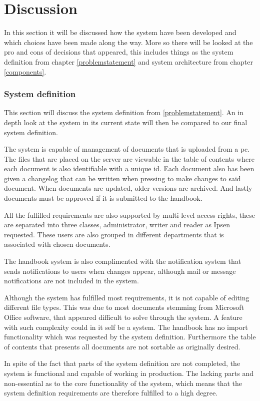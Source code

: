 \chapter{Discussion}
In this section it will be discussed how the system have been developed and which choices have been made along the way. More so there will be looked at the pro and cons of decisions that appeared, this includes things as the system definition from chapter \cref{problemstatement} and system architecture from chapter \cref{components}.

\subsection{System definition}
This section will discuss the system definition from \cref{problemstatement}. An in depth look at the system in its current state will then be compared to our final system definition.

The system is capable of management of documents that is uploaded from a pc. The files that are placed on the server are viewable in the table of contents where each document is also identifiable with a unique id. Each document also has been given a changelog that can be written when pressing to make changes to said document. When documents are updated, older versions are archived. And lastly documents must be approved if it is submitted to the handbook.

All the fulfilled requirements are also supported by multi-level access rights, these are separated into three classes, administrator, writer and reader as Ipsen requested. These users are also grouped in different departments that is associated with chosen documents. 

The handbook system is also complimented with the notification system that sends notifications to users when changes appear, although mail or message notifications are not included in the system.

Although the system has fulfilled most requirements, it is not capable of editing different file types. This was due to most documents stemming from Microsoft Office software, that appeared difficult to solve through the system. A feature with such complexity could in it self be a system. The handbook has no import functionality which was requested by the system definition. Furthermore the table of contents that presents all documents are not sortable as originally desired.

In spite of the fact that parts of the system definition are not completed, the system is functional and capable of working in production. The lacking parts and non-essential as to the core functionality of the system, which means that the system definition requirements are therefore fulfilled to a high degree.

